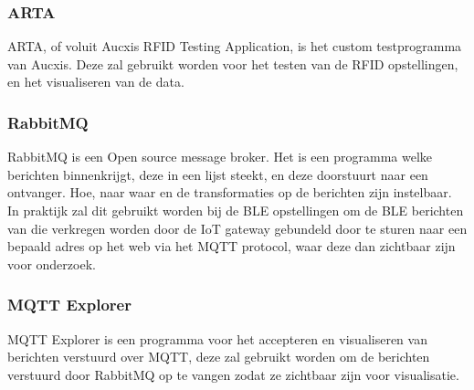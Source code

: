 \subsubsection{ARTA}
ARTA, of voluit Aucxis RFID Testing Application, is het custom testprogramma van Aucxis. Deze zal gebruikt worden voor het testen van de RFID opstellingen, en het visualiseren van de data.

\subsubsection{RabbitMQ}
RabbitMQ is een Open source message broker. Het is een programma welke berichten binnenkrijgt, deze in een lijst steekt, en deze doorstuurt naar een ontvanger. Hoe, naar waar en de transformaties op de berichten zijn instelbaar. In praktijk zal dit gebruikt worden bij de BLE opstellingen om de BLE berichten van die verkregen worden door de IoT gateway gebundeld door te sturen naar een bepaald adres op het web via het MQTT protocol, waar deze dan zichtbaar zijn voor onderzoek.\autocite{RabbitMQ2022}

\subsubsection{MQTT Explorer}
MQTT Explorer is een programma voor het accepteren en visualiseren van berichten verstuurd over MQTT, deze zal gebruikt worden om de berichten verstuurd door RabbitMQ op te vangen zodat ze zichtbaar zijn voor visualisatie.\autocite{Nordquist2019}
